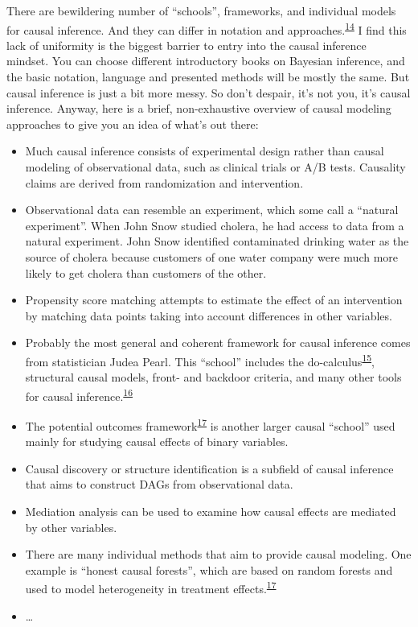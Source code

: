 \documentclass[
  10pt,
]{scrbook}
\providecommand{\tightlist}{%
  \setlength{\itemsep}{0pt}\setlength{\parskip}{0pt}}
\begin{document}
There are bewildering number of ``schools'', frameworks, and individual models for causal inference.
And they can differ in notation and approaches.\textsuperscript{\protect\hyperlink{ref-hernan2010causal}{14}}
I find this lack of uniformity is the biggest barrier to entry into the causal inference mindset.
You can choose different introductory books on Bayesian inference, and the basic notation, language and presented methods will be mostly the same.
But causal inference is just a bit more messy.
So don't despair, it's not you, it's causal inference.
Anyway, here is a brief, non-exhaustive overview of causal modeling approaches to give you an idea of what's out there:

\begin{itemize}
\tightlist
\item
  Much causal inference consists of experimental design rather than causal modeling of observational data, such as clinical trials or A/B tests. Causality claims are derived from randomization and intervention.
\item
  Observational data can resemble an experiment, which some call a ``natural experiment''. When John Snow studied cholera, he had access to data from a natural experiment. John Snow identified contaminated drinking water as the source of cholera because customers of one water company were much more likely to get cholera than customers of the other.
\item
  Propensity score matching attempts to estimate the effect of an intervention by matching data points taking into account differences in other variables.
\item
  Probably the most general and coherent framework for causal inference comes from statistician Judea Pearl. This ``school'' includes the do-calculus\textsuperscript{\protect\hyperlink{ref-pearl2012calculus}{15}}, structural causal models, front- and backdoor criteria, and many other tools for causal inference.\textsuperscript{\protect\hyperlink{ref-pearl2009causal}{16}}
\item
  The potential outcomes framework\textsuperscript{\protect\hyperlink{ref-athey2016recursive}{17}} is another larger causal ``school'' used mainly for studying causal effects of binary variables.
\item
  Causal discovery or structure identification is a subfield of causal inference that aims to construct DAGs from observational data.
\item
  Mediation analysis can be used to examine how causal effects are mediated by other variables.
\item
  There are many individual methods that aim to provide causal modeling. One example is ``honest causal forests'', which are based on random forests and used to model heterogeneity in treatment effects.\textsuperscript{\protect\hyperlink{ref-athey2016recursive}{17}}
\item
  \ldots{}
\end{itemize}
\end{document}
